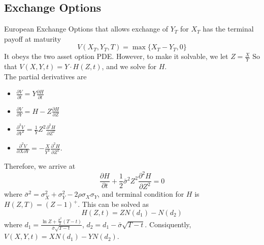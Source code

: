 \documentclass[12pt]{article}
\theoremstyle{definition}
\begin{document}
\subsection{Exchange Options}
European Exchange Options that allows exchange of $Y_T$ for $X_T$ has the terminal payoff at maturity
\[
V(X_T,Y_T,T)=\max\{X_T-Y_T,0\}
\]
It obeys the two asset option PDE. However, to make it solvable, we let $Z=\frac{X}{Y}$ So that $V(X,Y,t)=Y\cdot H(Z,t)$, and we solve for $H$.\\
The partial derivatives are
\begin{itemize}
	\item $\frac{\partial V}{\partial t}=Y\frac{\partial H}{\partial t}$
	\item $\frac{\partial V}{\partial Y}=H-Z\frac{\partial H}{\partial Z}$
	\item $\frac{\partial^2 V}{\partial Y^2}=\frac{1}{Y}Z^2\frac{\partial^2 H}{\partial Z^2}$
	\item $\frac{\partial^2 V}{\partial X\partial Y}=-\frac{X}{Y^2}\frac{\partial^2 H}{\partial Z^2}$.
\end{itemize}
Therefore, we arrive at
\[
\frac{\partial H}{\partial t}+\frac{1}{2}\bar{\sigma}^2Z^2\frac{\partial^2 H}{\partial Z^2}=0
\]
where $\bar{\sigma}^2=\sigma_X^2+\sigma_Y^2-2\rho\sigma_X\sigma_Y$, and terminal condition for $H$ is $H(Z,T)=(Z-1)^+$. This can be solved as
\[
H(Z,t)=ZN(d_1)-N(d_2)
\]
where $d_1=\frac{\ln Z+\frac{\bar{\sigma}^2}{2}(T-t)}{\bar{\sigma}\sqrt{T-t}}$, $d_2=d_1-\bar{\sigma}\sqrt{T-t}$. Consiquently, $V(X,Y,t)=XN(d_1)-YN(d_2)$.
\end{document}
